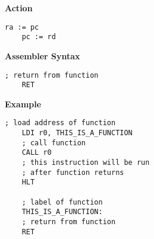 \vspace{3ex}

\textbf{Action}
\begin{lstlisting}[frame=single]
	ra := pc
	pc := rd
\end{lstlisting}

\vspace{3ex}

\textbf{Assembler Syntax}
\begin{lstlisting}[frame=single]
	; return from function
	RET
\end{lstlisting}

\vspace{3ex}

\textbf{Example}
\begin{lstlisting}[frame=single]
	; load address of function
	LDI r0, THIS_IS_A_FUNCTION
	; call function
	CALL r0
	; this instruction will be run
	; after function returns
	HLT
	
	; label of function
	THIS_IS_A_FUNCTION:
	; return from function
	RET
\end{lstlisting}